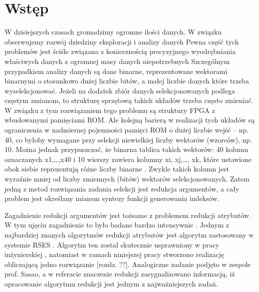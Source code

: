 \chapter{Wstęp}

W dzisiejszych czasach gromadzimy ogromne ilości danych.
W związku obserwujemy rozwój dziedziny eksploracji i analizy danych
Pewna część tych problemów jest ściśle związana z koniecznością precyzyjnego wyodrębniania właściwych danych z ogromnej masy danych niepotrzebnych
Szczególnym przypadkiem analizy danych są dane binarne, reprezentowane wektorami binarnymi o stosunkowo dużej liczbie bitów,
a małej liczbie danych które trzeba wyselekcjonować.
Jeżeli na dodatek zbiór danych selekcjonowanych podlega częstym zmianom,
to strukturę sprzętową takich układów trzeba często zmieniać.
W związku z tym rozwiązaniem tego problemu są struktury FPGA z wbudowanymi pamięciami ROM.
Ale kolejną barierą w realizacji tych układów są ograniczenia w nadmiernej pojemności pamięci ROM o dużej liczbie wejść – np. 40,
co byłoby wymagane przy selekcji niewielkiej liczby wektorów (wzorców), np. 10.
Można jednak przypuszczać, że binarna tablica takich wektorów: 40 kolumn oznaczanych x1,…,x40 i 10 wierszy zawiera kolumny xi, xj,…, xk,
które ustawione obok siebie reprezentują różne liczby binarne \cite{sasao-workshop}.
Zwykle takich kolumn jest wyraźnie mniej od liczby zmiennych (bitów) wektorów selekcjonowanych.
Zatem jedną z metod rozwiązania zadania selekcji jest redukcja argumentów,
a cały problem jest określany mianem syntezy funkcji generowania indeksów.

Zagadnienie redukcji argumentów jest tożsame z problemem redukcji atrybutów.
W tym ujęciu zagadnienie to było badane bardzo intensywnie \cite{fast-algorithm, efektywna-procedura, new-reduction, steinbach-posthoff, skowron-rauszer, slezak, novel-method}.
Jednym z najbardziej znanych algorytmów redukcji atrybutów jest algorytm zastosowany w systemie RSES \cite{rses}.
Algorytm ten został skutecznie usprawniony w pracy inżynierskiej \cite{efektywna-procedura},
natomiast w ramach niniejszej pracy stworzono realizację obliczającą jedno rozwiązanie [rozdz. ??].
Analogiczne zadanie podjęto w zespole prof. Sasao,
a w referacie \cite{sasao-workshop} znaczenie redukcji zasygnalizowano informacją,
iż opracowanie algorytmu redukcji jest jednym z najważniejszych zadań.

